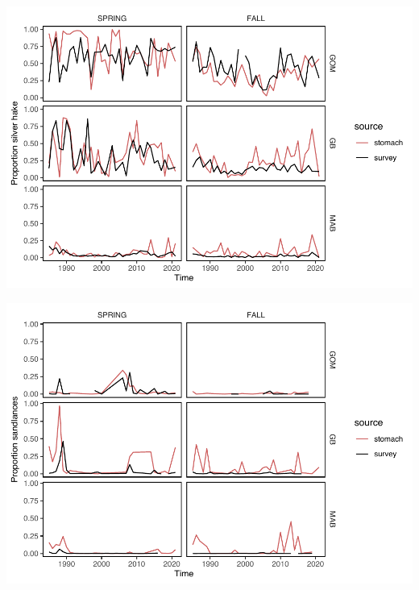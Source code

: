 \documentclass[
]{article}
\let\origfigure\figure
\let\endorigfigure\endfigure
\renewenvironment{figure}[1][2] {
    \expandafter\origfigure\expandafter[H]
} {
    \endorigfigure
}
\begin{document}
\begin{figure}
\centering
\includegraphics{Bluefish_forageindex_CJFAS_files/figure-latex/silver-1.pdf}
\caption{\label{fig:silver}Proportion of silver hake in stomach contents data (red) compared with survey biomass sampling (black) over time by region and season.}
\end{figure}

\begin{figure}
\centering
\includegraphics{Bluefish_forageindex_CJFAS_files/figure-latex/sandlance-1.pdf}
\caption{\label{fig:sandlance}Proportion of sandlance species in stomach contents data (red) compared with survey biomass sampling (black) over time by region and season.}
\end{figure}
\end{document}
